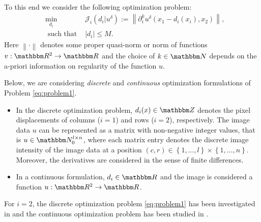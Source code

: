 \documentclass[runningheads,a4paper]{llncs}\usepackage{latexsym}
\newcommand{\R}{\mathbbm R}
\newcommand{\N}{\mathbbm N}
\newcommand{\Z}{\mathbbm Z}
\newcommand{\ud}{u^\delta}
\newcommand{\abs}[1]{\left| #1 \right|}
\newcommand{\set}[1]{\left\{ #1 \right\}}
\newcommand{\norm}[1]{\left\| #1 \right\|}
\begin{document}
To this end we consider the following optimization problem:
\begin{equation}
\label{eq:problem1}
\begin{array}{lll}
& \min_{d_i}& \mathcal{J}_i(d_i|\ud):=\norm{\partial_i^k \ud(x_1-d_i(x_i),x_2)},\\
& \text{ such that }& \abs{d_i}\leq M.
\end{array}
\end{equation}
Here $\norm{\cdot}$ denotes some proper quasi-norm or norm of functions $v : \R^2 \to \R$ and the choice of 
$k \in \N$ depends on the a-priori information on regularity of the function $u$.

Below, we are considering \emph{discrete} and \emph{continuous} optimization formulations of Problem \eqref{eq:problem1}.
\begin{itemize}
 \item In the discrete optimization problem, $d_i(x)  \in \Z$ denotes the pixel displacements of columns 
($i=1$) and rows ($i=2$), respectively. The image data $u$ can be represented as a matrix with non-negative 
integer values, that is $u \in \N_0^{l \times n}$, where each matrix entry denotes the discrete image intensity 
of the image data at a position $(c,r) \in \set{1,\ldots,l} \times \set{1,\ldots,n}$.
Moreover, the derivatives are considered in the sense of finite differences.
\item In a continuous formulation, $d_i \in \R$ and the image is considered a function $u: \R^2 \to \R$.
\end{itemize}

For $i=2$, the discrete optimization problem \eqref{eq:problem1} has been investigated in \cite{Nik09p,Nik09} 
and the continuous optimization problem has been studied in \cite{She04,DonPatSchOek15}.
\end{document}
